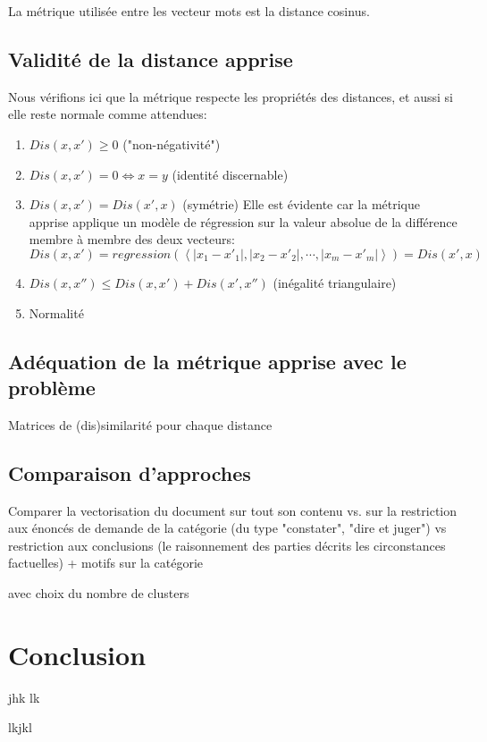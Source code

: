 La métrique utilisée entre les vecteur mots est la distance cosinus.

\subsection{Validité de la distance apprise}
Nous vérifions ici que la métrique respecte les propriétés des distances, et aussi si elle reste normale comme attendues:
\begin{enumerate}
	\item $Dis(x,x') \geq 0$ ("non-négativité")
	\item $Dis(x,x') = 0  \Leftrightarrow x = y$ (identité discernable)
	\item $Dis(x,x') = Dis(x', x)$ (symétrie)
	Elle est évidente car la métrique apprise applique un modèle de régression sur la valeur absolue de la différence membre à membre des deux vecteurs: \[Dis(x,x') = regression(\left\langle \vert x_1 - x'_1\vert, \vert x_2 - x'_2\vert, \cdots, \vert x_m - x'_m\vert\right\rangle )=Dis(x',x)\]
	\item $Dis(x,x'') \leq Dis(x,x') + Dis(x',x'')$ (inégalité triangulaire) 
	\item Normalité
\end{enumerate}

\subsection{Adéquation de la métrique apprise avec le problème}
Matrices de (dis)similarité pour chaque distance

\subsection{Comparaison d'approches}
Comparer la vectorisation du document sur tout son contenu vs. sur la restriction aux énoncés de demande de la catégorie (du type "constater", "dire et juger") vs restriction aux conclusions (le raisonnement des parties décrits les circonstances factuelles) + motifs sur la catégorie

avec choix du nombre de clusters


\section{Conclusion}
\label{sec:similarite:conclusion}
jhk
lk

lkjkl